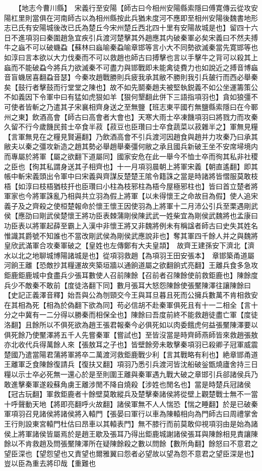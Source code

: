 　　【地志今曹川縣】　宋義行至安陽【師古曰今相州安陽縣索隱曰傅寛傳云從攻安陽杠里則當俱在河南師古以為相州縣按此兵猶未度河不應即至相州安陽後魏書地形志已氏有安陽城後改已氏為楚丘今宋州楚丘西北四十里有安陽故城是也】留四十六日不進項羽曰秦圍趙急宜疾引兵渡河楚擊其外趙應其内破秦軍必矣宋義曰不然夫搏牛之蝱不可以破蟣蝨【蘇林曰蝱喻秦蝨喻章邯等言小大不同勢欲滅秦當先寛邯等也如淳曰言本欲以大力伐秦而不可以救趙也師古曰搏擊也言以手擊牛之背可以殺其上蝱而不能破蝨今將兵力欲滅秦不可盡力與邯戰即未能禽徒費力也如說近之搏音博蝱音盲蟣居喜翻蝨音瑟】今秦攻趙戰勝則兵疲我承其敝不勝則我引兵皷行而西必舉秦矣【鼓行者擊鼓而行堂堂之陳也】故不如先鬬秦趙夫被堅執鋭義不如公坐運籌策公不如義因下令軍中曰有猛如虎狠如羊【狠何墾翻此併下三語指項羽也】貪如狼彊不可使者皆斬之乃遣其子宋襄相齊身送之至無鹽【班志東平國冇無鹽縣索隱曰在今鄆州之東】飲酒高會【師古曰高會者大會也】天寒大雨士卒凍饑項羽曰將戮力而攻秦久留不行今歲饑民貧士卒食半菽【菽豆也臣瓚曰士卒食蔬菜以菽雜半之】軍無見糧【言軍無見在之糧見賢遍翻】乃飲酒高會不引兵渡河因趙食與趙并力攻秦乃曰承其敝夫以秦之彊攻新造之趙其勢必舉趙舉秦彊何敝之承且國兵新破王坐不安席埽境内而專屬於將軍【屬之欲翻下道屬同】國家安危在此一舉今不恤士卒而徇其私非社稷之臣也【徇其私謂身送其子相齊也】十一月項羽晨朝上將軍宋義【朝直遙翻】即其帳中斬宋義頭出令軍中曰宋義與齊謀反楚楚王隂令籍誅之當是時諸將皆慴服莫敢枝梧【如淳曰枝梧猶枝扞也臣瓚曰小柱為枝邪柱為梧今屋極邪柱也】皆曰首立楚者將軍家也今將軍誅亂乃相與共立羽為假上將軍【以未得懷王之命故目為假】使人追宋義子及之齊殺之使桓楚報命於懷王懷王因使羽為上將軍十二月沛公引兵至栗遇剛武侯【應劭曰剛武侯楚懷王將功臣表棘蒲剛侯陳武武一姓柴宜為剛侯武魏將也孟康曰功臣表以將軍起薛至霸上入漢中非懷王將又非魏將例未有稱諡者師古曰史失其姓名惟識其爵號不知誰也不當改剛武侯為剛侯武應說非也】奪其軍四千餘人并之與魏將皇欣武滿軍合攻秦軍破之【皇姓也左傳鄭有大夫皇頡】　故齊王建孫安下濟北【濟水以北之地聊城博陽諸城是也】從項羽救趙【為項羽王田安張本】　章邯築甬道屬河餉王離【恐敵抄其糧運故夾築垣牆以通餉道屬之欲翻餉式亮翻】王離兵食多急攻鉅鹿鉅鹿城中食盡兵少張耳數使人召前陳餘【召前者召陳餘使前救鉅鹿也】陳餘度兵少不敵秦不敢前【度徒洛翻下同】數月張耳大怒怨陳餘使張黶陳澤往讓陳餘曰【史記正義澤音釋】始吾與公為刎頸交今王與耳旦暮且死而公擁兵數萬不肯相救安在其相為死【相為於偽翻下欲為同】苟必信胡不赴秦軍俱死且有十一二相全【言十分之中冀有一二分得以勝秦而相保全也】陳餘曰吾度前終不能救趙徒盡亡軍【度徒洛翻】且餘所以不俱死欲為趙王張君報秦今必俱死如以肉委餓虎何益張黶陳澤要以俱死餘乃使黶澤將五千人先嘗秦軍【嘗試也】至皆沒當是時齊師燕師皆來救趙張敖亦北收代兵得萬餘人來【張敖耳之子也】皆壁餘旁未敢擊秦項羽已殺卿子冠軍威震楚國乃遣當陽君蒲將軍將卒二萬渡河救鉅鹿戰少利【言其戰略有利也】絶章邯甬道王離軍乏食陳餘復請兵【復扶又翻】項羽乃悉引兵渡河皆沈船破釡甑燒廬舍持三日糧以示士卒必死無一還心於是至則圍王離與秦軍遇九戰大破之章邯引兵郤諸侯兵乃敢進擊秦軍遂殺蘇角虜王離涉閒不降自燒殺【涉姓也閒名也】當是時楚兵冠諸侯【冠古玩翻】軍救鉅鹿者十餘壁莫敢縱兵及楚擊秦諸侯將從壁上觀楚戰士無不一當十呼聲動天地【將即亮翻呼火故翻】諸侯軍無不人人惴恐【惴之睡翻】於是已破秦軍項羽召見諸侯將諸侯將入轅門【張晏曰軍行以車為陳轅相向為門師古曰周禮掌舍王行則設東宮轅門杜估曰昂車以其轅表門】無不膝行而前莫敢仰視項羽由是始為諸侯上將軍諸侯皆屬焉於是趙王歇及張耳乃得出鉅鹿城謝諸侯張耳與陳餘相見責讓陳餘以不肯救趙及問張黶陳澤所在疑陳餘殺之數以問餘【數所角翻】餘怒曰不意君之望臣深也【望怨望也又責望也爾雅翼曰怨者必望故以望為怨不意君之望臣深是也】豈以臣為重去將印哉【重難也